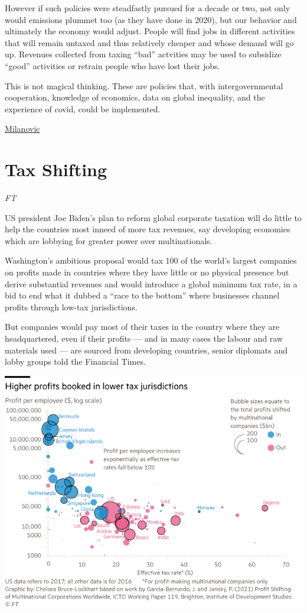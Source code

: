 \documentclass[
]{book}
\begin{document}
However if such policies were steadfastly pursued for a decade or two, not only would emissions plummet too (as they have done in 2020), but our behavior and ultimately the economy would adjust. People will find jobs in different activities that will remain untaxed and thus relatively cheaper and whose demand will go up. Revenues collected from taxing ``bad'' actvities may be used to subsidize ``good'' activities or retrain people who have lost their jobs.

This is not magical thinking. These are policies that, with intergovernmental cooperation, knowledge of economics, data on global inequality, and the experience of covid, could be implemented.

\href{http://glineq.blogspot.com/2021/02/climate-change-covid-and-global.html}{Milanovic}

\hypertarget{tax-shifting}{%
\section{Tax Shifting}\label{tax-shifting}}

\emph{FT}

US president Joe Biden's plan to reform global corporate taxation will do little to help the countries most inneed of more tax revenues, say developing economies which are lobbying for greater power over multinationals.

Washington's ambitious proposal would tax 100 of the world's largest companies on profits made in countries where they have little or no physical presence but derive substantial revenues and would introduce a global minimum tax rate, in a bid to end what it dubbed a ``race to the bottom'' where businesses channel profits through low-tax jurisdictions.

But companies would pay most of their taxes in the country where they are headquartered, even if their profits --- and in many cases the labour and raw materials used --- are sourced from developing countries, senior diplomats and lobby groups told the Financial Times.

\includegraphics{fig/ft_tax_shifting.png}
\end{document}
